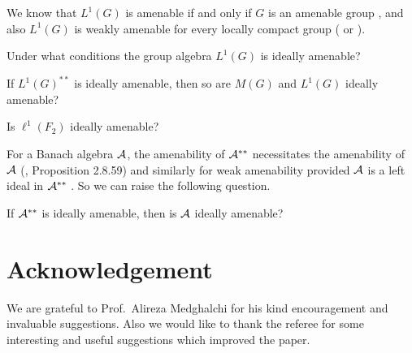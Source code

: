 \documentclass[fleqn]{mat01}
\begin{document}
We know that $L^1(G)$ is amenable if and only if $G$ is an amenable
group \cite{Jo1}, and also $L^1(G)$ is weakly amenable for every locally
compact group (\cite{Jo1} or \cite{D-Gh}).

\begin{quest}{\rm 
Under what conditions the group algebra $L^1(G)$ is ideally amenable?}
\end{quest}

\begin{quest}{\rm 
If $L^1(G)^{**}$ is ideally amenable, then so are $M(G)$ and $L^1(G)$
ideally amenable?}
\end{quest}

\begin{quest}{\rm 
Is $\ell^1(F_2)$ ideally amenable?}
\end{quest}

For a Banach algebra $\cal A$, the amenability of $\cal A^{**}$
necessitates the amenability of $\cal A$ (\cite{Da}, Proposition 2.8.59) and similarly for weak
amenability provided $\cal A$ is a left ideal in $\cal A^{**}$
\cite{Gh-L-W}. So we can raise the following question.

\begin{quest}{\rm 
If $\cal A^{**}$ is ideally amenable, then is $\cal A$ ideally amenable?}
\end{quest}
\pagebreak

\section*{Acknowledgement}

We are grateful to Prof.~Alireza Medghalchi for his kind
encouragement and invaluable suggestions. Also we would like to thank
the referee for some interesting and useful suggestions which improved
the paper.
\end{document}
